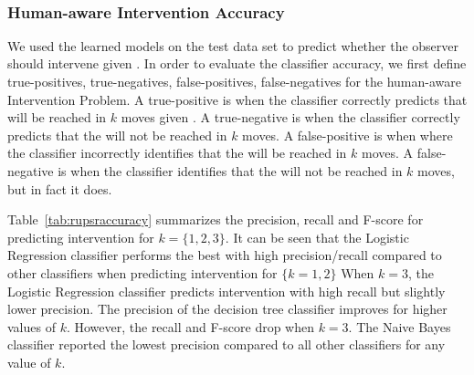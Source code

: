 ~\subsubsection{Human-aware Intervention Accuracy}
We used the learned models on the test data set to predict whether the observer should intervene given \historyDef. 
In order to evaluate the classifier accuracy, we first define true-positives, true-negatives, false-positives, false-negatives for the human-aware Intervention Problem. 
A true-positive is when the classifier correctly predicts that \undesired will be reached in $k$ moves given \historyDef.
A true-negative is when the classifier correctly predicts that the \undesired will not be reached in $k$ moves.
A false-positive is when where the classifier incorrectly identifies that the \undesired will be reached in $k$ moves.
A false-negative is when the classifier identifies that the \undesired will not be reached in $k$ moves, but in fact it does.


Table~\ref{tab:rupsraccuracy} summarizes the precision, recall and F-score for predicting intervention for $k=\lbrace 1,2,3 \rbrace$. 
It can be seen that the Logistic Regression classifier performs the best with high precision/recall compared to other classifiers when predicting intervention for $\lbrace k=1,2\rbrace$
When $k=3$, the Logistic Regression classifier predicts intervention with high recall but slightly lower precision. 
The precision of the decision tree classifier improves for higher values of $k$.
However, the recall and F-score drop when $k=3$.
The Naive Bayes classifier reported the lowest precision compared to all other classifiers for any value of $k$.

